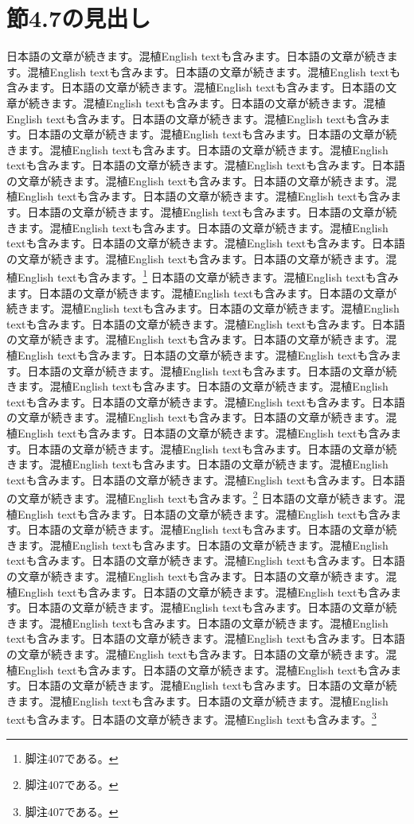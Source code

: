\documentclass[pdflatex,book]{jlreq}
\begin{document}
\section{節4.7の見出し}
日本語の文章が続きます。混植English textも含みます。日本語の文章が続きます。混植English textも含みます。日本語の文章が続きます。混植English textも含みます。日本語の文章が続きます。混植English textも含みます。日本語の文章が続きます。混植English textも含みます。日本語の文章が続きます。混植English textも含みます。日本語の文章が続きます。混植English textも含みます。日本語の文章が続きます。混植English textも含みます。日本語の文章が続きます。混植English textも含みます。日本語の文章が続きます。混植English textも含みます。日本語の文章が続きます。混植English textも含みます。日本語の文章が続きます。混植English textも含みます。日本語の文章が続きます。混植English textも含みます。日本語の文章が続きます。混植English textも含みます。日本語の文章が続きます。混植English textも含みます。日本語の文章が続きます。混植English textも含みます。日本語の文章が続きます。混植English textも含みます。日本語の文章が続きます。混植English textも含みます。日本語の文章が続きます。混植English textも含みます。日本語の文章が続きます。混植English textも含みます。\footnote{脚注407である。}
日本語の文章が続きます。混植English textも含みます。日本語の文章が続きます。混植English textも含みます。日本語の文章が続きます。混植English textも含みます。日本語の文章が続きます。混植English textも含みます。日本語の文章が続きます。混植English textも含みます。日本語の文章が続きます。混植English textも含みます。日本語の文章が続きます。混植English textも含みます。日本語の文章が続きます。混植English textも含みます。日本語の文章が続きます。混植English textも含みます。日本語の文章が続きます。混植English textも含みます。日本語の文章が続きます。混植English textも含みます。日本語の文章が続きます。混植English textも含みます。日本語の文章が続きます。混植English textも含みます。日本語の文章が続きます。混植English textも含みます。日本語の文章が続きます。混植English textも含みます。日本語の文章が続きます。混植English textも含みます。日本語の文章が続きます。混植English textも含みます。日本語の文章が続きます。混植English textも含みます。日本語の文章が続きます。混植English textも含みます。日本語の文章が続きます。混植English textも含みます。\footnote{脚注407である。}
日本語の文章が続きます。混植English textも含みます。日本語の文章が続きます。混植English textも含みます。日本語の文章が続きます。混植English textも含みます。日本語の文章が続きます。混植English textも含みます。日本語の文章が続きます。混植English textも含みます。日本語の文章が続きます。混植English textも含みます。日本語の文章が続きます。混植English textも含みます。日本語の文章が続きます。混植English textも含みます。日本語の文章が続きます。混植English textも含みます。日本語の文章が続きます。混植English textも含みます。日本語の文章が続きます。混植English textも含みます。日本語の文章が続きます。混植English textも含みます。日本語の文章が続きます。混植English textも含みます。日本語の文章が続きます。混植English textも含みます。日本語の文章が続きます。混植English textも含みます。日本語の文章が続きます。混植English textも含みます。日本語の文章が続きます。混植English textも含みます。日本語の文章が続きます。混植English textも含みます。日本語の文章が続きます。混植English textも含みます。日本語の文章が続きます。混植English textも含みます。\footnote{脚注407である。}
\end{document}

